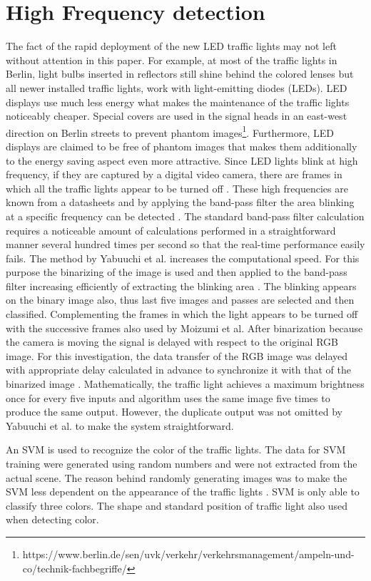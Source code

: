 \documentclass[letterpaper, 10 pt, conference]{ieeeconf} %
\begin{document}
\section{High Frequency detection}
The fact of the rapid deployment of the new LED traffic lights may not left without attention in this paper. For example, at most of the traffic lights in Berlin, light bulbs inserted in reflectors still shine behind the colored lenses but all newer installed traffic lights, work with light-emitting diodes (LEDs). LED displays use much less energy what makes the maintenance of the traffic lights noticeably cheaper. Special covers are used in the signal heads in an east-west direction on Berlin streets to prevent phantom images\footnote{https://www.berlin.de/sen/uvk/verkehr/verkehrsmanagement/ampeln-und-co/technik-fachbegriffe/}. Furthermore, LED displays are claimed to be free of phantom images that makes them additionally to the energy saving aspect even more attractive. Since LED lights blink at high frequency, if they are captured by a digital video camera, there are frames in which all the traffic lights appear to be turned off \cite{c3}. These high frequencies are known from a datasheets and by applying the band-pass filter the area blinking at a specific frequency can be detected \cite{c8}.  The standard band-pass filter calculation requires a noticeable amount of calculations performed in a straightforward manner several hundred times per second so that the real-time performance easily fails. The method by Yabuuchi et al. increases the computational speed. For this purpose the binarizing of the image is used and then applied to the band-pass filter increasing efficiently of extracting the blinking area \cite{c8}. The blinking appears on the binary image  also, thus last five images and passes are selected and then classified. Complementing the frames in which the light appears to be turned off with the successive frames also used by Moizumi et al. After binarization because the camera is moving the signal is delayed with respect to the original RGB image. For this investigation, the data transfer of the RGB image was delayed  with appropriate delay calculated in advance to synchronize it with that of the binarized image \cite{c8}. Mathematically, the traffic light achieves a maximum brightness once for every five inputs and algorithm uses the same image five times to produce the same output. However, the duplicate output was not omitted by Yabuuchi et al. to make the system straightforward. 

An SVM is used to recognize the color of the traffic lights. The data for SVM training were generated using random numbers and were not extracted from the actual scene. The reason behind randomly generating images was to make the SVM less dependent on the appearance of the traffic lights \cite{c8}. SVM is only able to classify three colors. The shape and standard position of traffic light also used when detecting color.   
 
\end{document}
